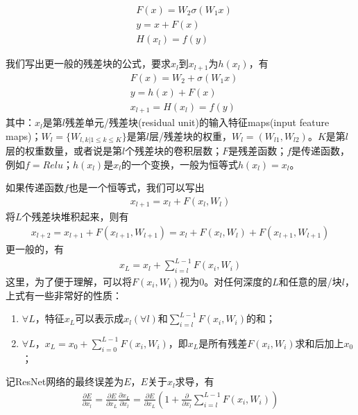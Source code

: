             \begin{align*}
            & F(x) = W_2\sigma (W_1x)\\
            & y = x+F(x)\\
            & H(x_l) = f(y)
            \end{align*}
            \par
            我们写出更一般的残差块的公式，要求$x_l$到$x_{l+1}$为$h(x_l)$，有
            \begin{align*}
            & F(x) = W_2+\sigma(W_1x)\\
            & y = h(x)+F(x)\\
            & x_{l+1} = H(x_l) = f(y)
            \end{align*}
            其中：$x_l$是第$l$残差单元/残差块(residual unit)的输入特征maps(input feature maps)；$W_l=\{W_{l,k|1 \leqslant k \leqslant K}\}$是第$l$层/残差块的权重，$W_l = (W_{l1},W_{l2})$。$K$是第$l$层的权重数量，或者说是第$l$个残差块的卷积层数；$F$是残差函数；$f$是传递函数，例如$f = Relu$；$h(x_l)$是$x_l$的一个变换，一般为恒等式$h(x_l) = x_l$。
            \par
            如果传递函数$f$也是一个恒等式，我们可以写出
            \begin{align*}
            x_{l+1} = x_l+F(x_l,W_l)
            \end{align*}
            将$L$个残差块堆积起来，则有
            \begin{align*}
            x_{l+2} = x_{l+1} + F(x_{l+1}, W_{l+1}) = x_l + F(x_l,W_l)+F(x_{l+1},W_{l+1})
            \end{align*}
            更一般的，有
            \begin{align*}
            x_L =x_l + \sum_{i=l}^{L-1}F(x_i,W_i)
            \end{align*}
            这里，为了便于理解，可以将$F(x_i,W_i)$视为0。对任何深度的$L$和任意的层/块$l$，上式有一些非常好的性质：
            \begin{enumerate}
            \item $\forall L$，特征$x_L$可以表示成$x_l(\forall l)$和$\sum\limits_{i=l}^{L-1}F(x_i,W_i)$的和；
            \item $\forall L$，$x_L =x_0 + \sum\limits_{i=0}^{L-1}F(x_i,W_i)$，即$x_L$是所有残差$F(x_i,W_i)$求和后加上$x_0$；
            \end{enumerate}
            \par
            记ResNet网络的最终误差为$E$，$E$关于$x_l$求导，有
            \begin{align*}
            \frac{\partial E}{\partial x_l} = \frac{\partial E}{\partial x_L} \frac{\partial x_L}{\partial x_l} = \frac{\partial E}{\partial x_L} \left( 1+\frac{\partial }{\partial x_l}\sum_{i=l}^{L-1}F(x_i,W_i) \right)
            \end{align*}
